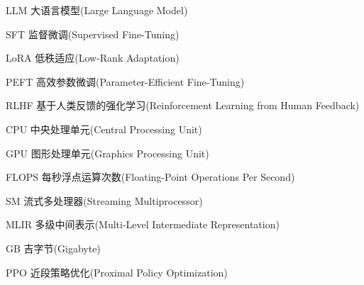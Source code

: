 
\begin{denotation}[3cm]
  \item[LLM] 大语言模型(Large Language Model)
  \item[SFT] 监督微调(Supervised Fine-Tuning)
  \item[LoRA] 低秩适应(Low-Rank Adaptation)
  \item[PEFT] 高效参数微调(Parameter-Efficient Fine-Tuning)
  \item[RLHF] 基于人类反馈的强化学习(Reinforcement Learning from Human Feedback)
  \item[CPU] 中央处理单元(Central Processing Unit)
  \item[GPU] 图形处理单元(Graphics Processing Unit)
  \item[FLOPS] 每秒浮点运算次数(Floating-Point Operations Per Second)
  \item[SM] 流式多处理器(Streaming Multiprocessor)
  \item[MLIR] 多级中间表示(Multi-Level Intermediate Representation)
  \item[GB] 吉字节(Gigabyte)
  \item[PPO] 近段策略优化(Proximal Policy Optimization)
\end{denotation}





